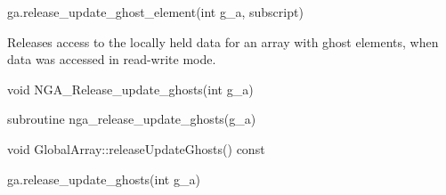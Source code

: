 \documentclass[12pt]{article}
\begin{document}
\begin{pyapi}
\begin{pycode}
ga.release_update_ghost_element(int g_a, subscript)
\end{pycode}
\begin{funcargs}
\end{funcargs}
\end{pyapi}

\local

\begin{desc}

Releases access to the locally held data for an array with ghost elements, when
data was accessed in read-write mode.

\end{desc}



\begin{capi}
\begin{ccode}
void NGA_Release_update_ghosts(int g_a)
\end{ccode}
\begin{funcargs}
\end{funcargs}
\end{capi}

\begin{fapi}
\begin{fcode}
subroutine nga_release_update_ghosts(g_a)
\end{fcode}
\begin{funcargs}
\end{funcargs}
\end{fapi}

\begin{cxxapi}
\begin{cxxcode}
void GlobalArray::releaseUpdateGhosts() const
\end{cxxcode}
\end{cxxapi}

\begin{pyapi}
\begin{pycode}
ga.release_update_ghosts(int g_a)
\end{pycode}
\begin{funcargs}
\end{funcargs}
\end{pyapi}
\end{document}
